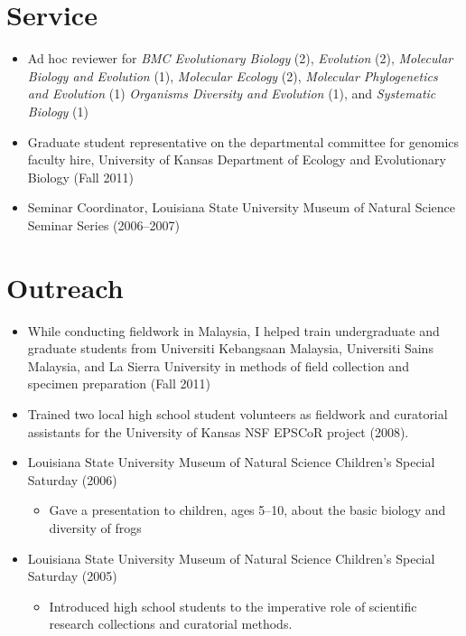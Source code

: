 \documentclass[10pt]{article}
\newenvironment{myItemize}{
  \begin{itemize}
    \setlength{\leftskip}{-4mm}
    \setlength{\itemsep}{0.25em}
    \setlength{\parskip}{0pt}
    \setlength{\parsep}{0.5em}}
  {\end{itemize}}
\begin{document}
\section*{Service}
\begin{myItemize}
\item Ad hoc reviewer for
    \emph{BMC Evolutionary Biology} (2),
    \emph{Evolution} (2),
    \emph{Molecular Biology and Evolution} (1),
    \emph{Molecular Ecology} (2),
    \emph{Molecular Phylogenetics and Evolution} (1)
    \emph{Organisms Diversity and Evolution} (1), and
    \emph{Systematic Biology} (1)
\item Graduate student representative on the departmental committee for
    genomics faculty hire, University of Kansas Department of Ecology and
    Evolutionary Biology (Fall 2011)
\item Seminar Coordinator, Louisiana State University Museum of Natural Science
    Seminar Series (2006--2007)
\end{myItemize}

\section*{Outreach}
\begin{myItemize}
\item While conducting fieldwork in Malaysia, I helped train undergraduate and
    graduate students from Universiti Kebangsaan Malaysia, Universiti Sains
    Malaysia, and La Sierra University in methods of field collection and
    specimen preparation (Fall 2011)
\item Trained two local high school student volunteers as fieldwork and
    curatorial assistants for the University of Kansas NSF EPSCoR project
    (2008).
\item Louisiana State University Museum of Natural Science Children's Special
    Saturday (2006)
    \begin{myItemize}
        \item Gave a presentation to children, ages 5--10, about the basic
            biology and diversity of frogs
    \end{myItemize}
\item Louisiana State University Museum of Natural Science Children's Special
    Saturday (2005)
    \begin{myItemize}
        \item Introduced high school students to the imperative role of
            scientific research collections and curatorial methods.
    \end{myItemize}
\end{myItemize}
\end{document}
